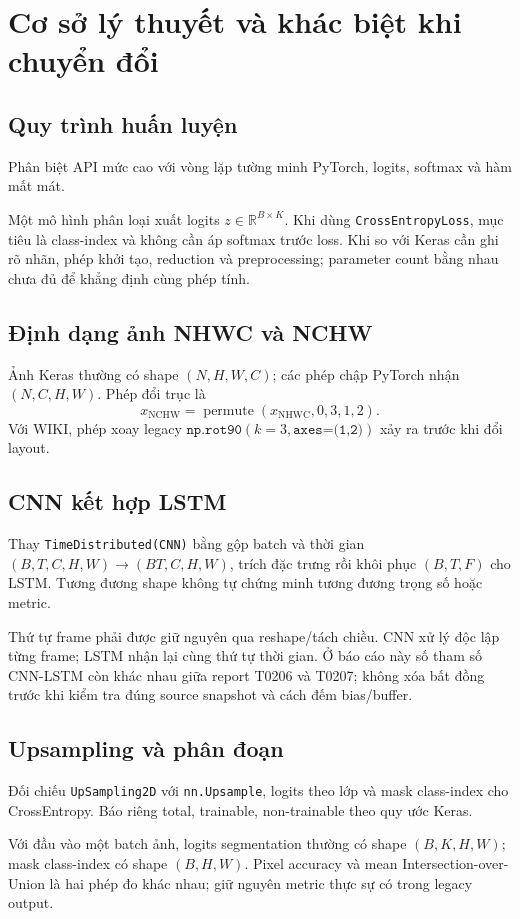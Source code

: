 \chapter{Cơ sở lý thuyết và khác biệt khi chuyển đổi}
\section{Quy trình huấn luyện}
Phân biệt API mức cao với vòng lặp tường minh PyTorch, logits, softmax và hàm mất mát.

Một mô hình phân loại xuất logits $z\in\mathbb{R}^{B\times K}$. Khi dùng \texttt{CrossEntropyLoss}, mục tiêu là class-index và không cần áp softmax trước loss. Khi so với Keras cần ghi rõ nhãn, phép khởi tạo, reduction và preprocessing; parameter count bằng nhau chưa đủ để khẳng định cùng phép tính.

\section{Định dạng ảnh NHWC và NCHW}
Ảnh Keras thường có shape $(N,H,W,C)$; các phép chập PyTorch nhận $(N,C,H,W)$. Phép đổi trục là
\[
x_{\mathrm{NCHW}}=\operatorname{permute}(x_{\mathrm{NHWC}},0,3,1,2).
\]
Với WIKI, phép xoay legacy $\texttt{np.rot90}(k=3,\texttt{axes=(1,2)})$ xảy ra trước khi đổi layout.

\section{CNN kết hợp LSTM}
Thay \texttt{TimeDistributed(CNN)} bằng gộp batch và thời gian $(B,T,C,H,W)\to(BT,C,H,W)$, trích đặc trưng rồi khôi phục $(B,T,F)$ cho LSTM. Tương đương shape không tự chứng minh tương đương trọng số hoặc metric.

Thứ tự frame phải được giữ nguyên qua reshape/tách chiều. CNN xử lý độc lập từng frame; LSTM nhận lại cùng thứ tự thời gian. Ở báo cáo này số tham số CNN-LSTM còn khác nhau giữa report T0206 và T0207; không xóa bất đồng trước khi kiểm tra đúng source snapshot và cách đếm bias/buffer.

\section{Upsampling và phân đoạn}
Đối chiếu \texttt{UpSampling2D} với \texttt{nn.Upsample}, logits theo lớp và mask class-index cho CrossEntropy. Báo riêng total, trainable, non-trainable theo quy ước Keras.

Với đầu vào một batch ảnh, logits segmentation thường có shape $(B,K,H,W)$; mask class-index có shape $(B,H,W)$. Pixel accuracy và mean Intersection-over-Union là hai phép đo khác nhau; giữ nguyên metric thực sự có trong legacy output.

